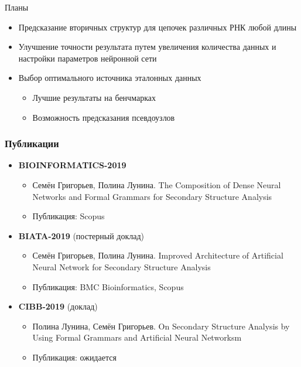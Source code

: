 \documentclass{beamer}
\begin{document}
\begin{frame}{Планы}
\begin{itemize}
    \item Предсказание вторичных структур для цепочек различных РНК любой длины
    \item Улучшение точности результата путем увеличения количества данных и настройки параметров нейронной сети 
    \item Выбор оптимального источника эталонных данных
    \begin{itemize}
        \item Лучшие результаты на бенчмарках
        \item Возможность предсказания псевдоузлов
    \end{itemize}
\end{itemize}

\end{frame}

\begin{frame}\frametitle{Публикации}
\begin{itemize}
    \item \textbf{BIOINFORMATICS-2019}
      \begin{itemize}
        \item Семён Григорьев, Полина Лунина. The Composition of Dense Neural Networks and Formal Grammars for Secondary Structure Analysis
        \item Публикация: Scopus
      \end{itemize}
      \item \textbf{BIATA-2019} (постерный доклад)
      \begin{itemize}
         \item Семён Григорьев, Полина Лунина. Improved Architecture of Artificial Neural Network for Secondary Structure Analysis
         \item Публикация: BMC Bioinformatics, Scopus
      \end{itemize}
      \item \textbf{CIBB-2019} (доклад)
      \begin{itemize}
        \item Полина Лунина, Семён Григорьев. On Secondary Structure Analysis by Using Formal Grammars and Artificial Neural Networksm
        \item Публикация: ожидается
      \end{itemize}
\end{itemize}

\end{frame}
\end{document}
